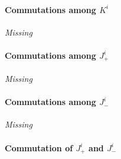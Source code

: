 \documentclass[11pt, english, fleqn, DIV=15, headinclude, BCOR=1cm]{scrartcl}
\begin{document}
\paragraph{Commutations among $K^i$}

\emph{Missing}

\paragraph{Commutations among $J_+^i$}

\emph{Missing}

\paragraph{Commutations among $J_-^i$}

\emph{Missing}

\paragraph{Commutation of $J_+^i$ and $J_-^i$}
\end{document}
